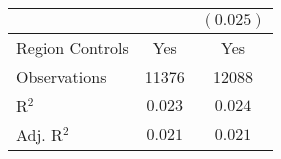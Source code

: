 \begin{center}
\begin{tiny}
\begin{longtable}{l@{} c@{} c@{}}
                                                                           &                 & $(0.025)$      \\
\hline
Region Controls                                                            & Yes             & Yes            \\
Observations                                                               & 11376           & 12088          \\
R$^2$                                                                      & $0.023$         & $0.024$        \\
Adj. R$^2$                                                                 & $0.021$         & $0.021$        \\
\end{longtable}
\end{tiny}
\end{center}
